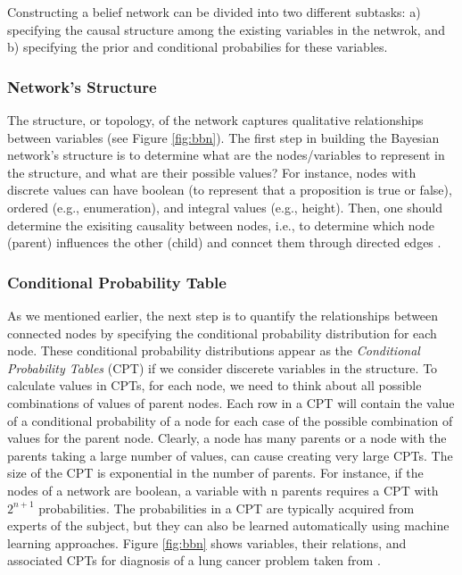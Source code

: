 \documentclass[11pt]{article}
\begin{document}
Constructing a belief network can be divided into two different subtasks: a)
specifying the causal structure among the existing variables in the netwrok, and
b) specifying the prior and conditional probabilies for these variables.

\subsubsection{Network's Structure}

The structure, or topology, of the network captures qualitative relationships
between variables (see Figure \ref{fig:bbn}). The first step in building the
Bayesian network's structure is to determine what are the nodes/variables to
represent in the structure, and what are their possible values? For instance,
nodes with discrete values can have boolean (to represent that a proposition is
true or false), ordered (e.g., enumeration), and integral values (e.g., height).
Then, one should determine the exisiting causality between nodes, i.e., to
determine which node (parent) influences the other (child) and conncet them
through directed edges \cite{korb:bayesian-ai}.

\subsubsection{Conditional Probability Table}

As we mentioned earlier, the next step is to quantify the relationships between
connected nodes by specifying the conditional probability distribution for each
node. These conditional probability distributions appear as the
\textit{Conditional Probability Tables} (CPT) if we consider discerete variables
in the structure. To calculate values in CPTs, for each node, we need to think
about all possible combinations of values of parent nodes. Each row in a CPT
will contain the value of a conditional probability of a node for each case of
the possible combination of values for the parent node. Clearly, a node has many
parents or a node with the parents taking a large number of values, can cause
creating very large CPTs. The size of the CPT is exponential in the number of
parents. For instance, if the nodes of a network are boolean, a variable with n
parents requires a CPT with $2^{n+1}$ probabilities. The probabilities in a CPT
are typically acquired from experts of the subject, but they can also be learned
automatically using machine learning approaches. Figure \ref{fig:bbn} shows
variables, their relations, and associated CPTs for diagnosis of a lung cancer
problem taken from \cite{korb:bayesian-ai}.
\end{document}

